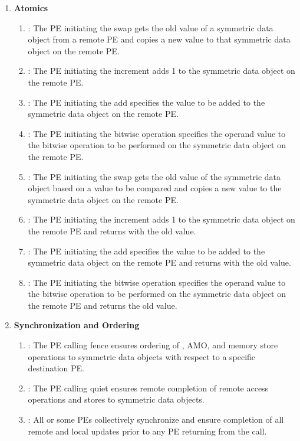 \begin{enumerate}
\item \textbf{Atomics}
\begin{enumerate}
    \item {}: The \ac{PE} initiating the swap gets the old value of a
        symmetric data object from a remote \ac{PE} and copies a new value to
        that symmetric data object on the remote \ac{PE}.
  \item {}: The \ac{PE} initiating the increment adds 1 to the
      symmetric data object on the remote \ac{PE}.
  \item {}: The \ac{PE} initiating the add specifies the value to be added
      to the symmetric data object on the remote \ac{PE}.
  \item {}: The \ac{PE} initiating the bitwise
      operation specifies the operand value to the bitwise operation to be
      performed on the symmetric data object on the remote \ac{PE}.
  \item {}: The \ac{PE} initiating the swap gets the old value
      of the symmetric data object based on a value to be compared and copies a
      new value to the symmetric data object on the remote \ac{PE}.
  \item {}: The \ac{PE} initiating the increment adds 1 to
      the symmetric data object on the remote \ac{PE} and returns with the old
      value.
  \item {}: The \ac{PE} initiating the add specifies the value to
      be added to the symmetric data object on the remote \ac{PE} and returns with
      the old value.
  \item {}: The \ac{PE} initiating the bitwise
      operation specifies the operand value to the bitwise operation to be
      performed on the symmetric data object on the remote \ac{PE}
      and returns the old value.
\end{enumerate}

\item \textbf{Synchronization and Ordering}
\begin{enumerate}
  \item {}: The \ac{PE} calling fence ensures ordering of   
  \PUT, AMO, and memory store operations
  to symmetric data objects with respect to a specific
      destination \ac{PE}. 
  \item {}: The \ac{PE} calling quiet ensures remote completion of remote access
      operations and stores to symmetric data objects. 
  \item {}: All or some \acp{PE} collectively synchronize and ensure
      completion of all remote and local updates prior to any \ac{PE} returning
      from the call.
\end{enumerate}


\end{enumerate}
